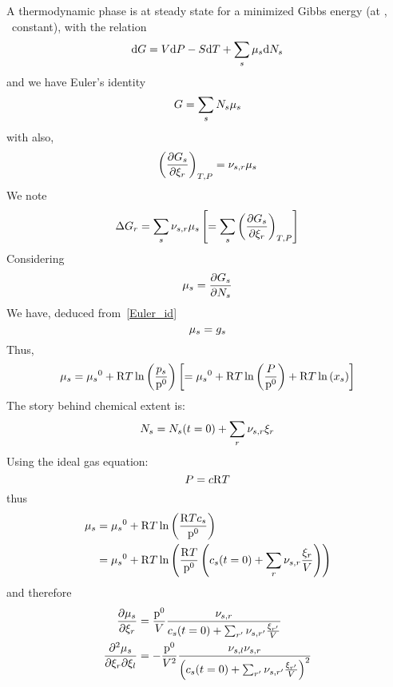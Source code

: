 A thermodynamic phase is at steady state
for a minimized Gibbs energy (at \Temp, \Press\ constant), with
the relation
\begin{equation}
\dd\Gibbs = \Vol\dd\Press - \Entr\dd\Temp + \sum_s\chempot[s]\dd\Mol[s]
\end{equation}
and we have Euler's identity
\begin{equation}
\Gibbs = \sum_s \Mol[s]\chempot[s]
\label{Euler_id}
\end{equation}
with also,
\begin{equation}
\left(\doverdext[r]{\Gibbs[s]}\right)_{\Temp,\Press} = \scoef[s,r]\chempot[s]
\end{equation}
We note
\begin{equation}
\DGibbs_r = \sum_s \scoef[s,r]\chempot[s] \left[= \sum_s \left(\doverdext[r]{\Gibbs[s]}\right)_{\Temp,\Press}\right]
\end{equation}
Considering
\begin{equation}
\chempot_s = \doverdn[s]{\Gibbs[s]}
\end{equation}
We have, deduced from~\ref{Euler_id}
\begin{equation}
\chempot[s] = \gibbs[s]
\end{equation}
Thus,
\begin{equation}
\chempot[s] = \chempotZ[s] + \Rg\Temp\ln\left(\frac{\press[s]}{\pz}\right)
     \left[ = \chempotZ[s] + \Rg\Temp\ln\left(\frac{\Press}{\pz}\right) + \Rg\Temp\ln\left(\molarfrac[s]\right) \right]
\end{equation}
The story behind chemical extent is:
\begin{equation}
\Mol[s] = \Mol[s](t=0) + \sum_r \scoef[s,r] \ext[r]
\end{equation}
Using the ideal gas equation:
\begin{equation}
\Press = \conc \Rg \Temp
\end{equation}
thus
\begin{equation}
\begin{split}
\chempot[s] & = \chempotZ[s] + \Rg\Temp\ln\left(\frac{\Rg \Temp \molar[s]}{\pz}\right) \\
            & = \chempotZ[s] + \Rg\Temp\ln\left(\frac{\Rg \Temp}{\pz}\left(\molar[s](t=0) + \sum_r \scoef[s,r]\frac{\ext[r]}{\Vol}\right)\right) \\
\end{split}
\end{equation}
and therefore
\begin{equation}
\begin{split}
\doverdext[r]{\chempot[s]}      & = \frac{\pz}{\Vol}\frac{\scoef[s,r]}{\molar[s](t=0) + \sum_{r'} \scoef[s,r']\frac{\ext[r']}{\Vol}}\\
\ddoverddext{\chempot[s]}{r}{l} & = -\frac{\pz}{\Vol^2}\frac{\scoef[s,l]\scoef[s,r]}{\left(\molar[s](t=0) + \sum_{r'} \scoef[s,r']\frac{\ext[r']}{\Vol}\right)^2}\\
\end{split}
\end{equation}
